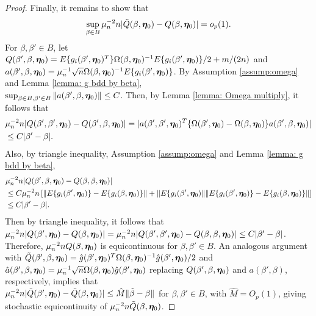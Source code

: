 \documentclass[12pt]{article}
\begin{document}
{\begin{proof}
Finally, it remains to show that 
\[
\sup_{\beta\in B} \mu_n^{-2} n |\tilde Q (\beta, \bm \eta_0)- {Q} (\beta, \bm \eta_0) | =o_p(1).
\]
For $\beta, \beta'\in B$, let  $Q(\beta', \beta, \bm \eta_0)= E\{g_i(\beta', \bm \eta_0)^T\} \Omega(\beta, \bm \eta_0)^{-1} E\{g_i(\beta', \bm \eta_0)\}/2+ m/(2n) $ and  $a(\beta', \beta, \bm \eta_0)= \mu_n^{-1} \sqrt{n} \Omega(\beta, \bm \eta_0)^{-1} E\{g_i(\beta', \bm \eta_0)\} $. By Assumption \ref{assump:omega} and Lemma \ref{lemma: g bdd by beta}, \\ $\sup_{\beta\in B, \beta'\in B }\|a(\beta', \beta, \bm \eta_0) \|\leq C $. Then, by Lemma \ref{lemma: Omega multiply},  it follows that 
\begin{align*}
   & \mu_n^{-2}n |Q(\beta', \beta', \bm \eta_0) -  Q(\beta', \beta, \bm \eta_0)  |= |a(\beta', \beta', \bm \eta_0)^T\{\Omega(\beta', \bm \eta_0) - \Omega(\beta, \bm \eta_0)\}  a(\beta', \beta, \bm \eta_0) | \\
    & \leq C |\beta'-\beta|.
\end{align*}
Also, by triangle inequality, Assumption \ref{assump:omega} and Lemma \ref{lemma: g bdd by beta}, 
\begin{align*}
    &\mu_n^{-2} n |Q(\beta', \beta, \bm \eta_0) -  Q(\beta, \beta, \bm \eta_0)  | \\
    &\leq C\mu_n^{-2} n \left[\|E\{g_i(\beta',\bm \eta_0) \} -E\{g_i(\beta,\bm \eta_0) \} \| + \|E\{g_i(\beta',\bm \eta_0)\| \|E\{g_i(\beta',\bm \eta_0) \} -E\{g_i(\beta,\bm \eta_0) \} \| \right] \\
    &\leq C|\beta'-\beta|.
\end{align*}
Then by triangle inequality, it follows that $\mu_n^{-2}n |Q(\beta', \bm \eta_0)- Q(\beta, \bm \eta_0)|= \mu_n^{-2}n |Q(\beta', \beta',\bm \eta_0)- Q(\beta, \beta, \bm \eta_0)|\leq C|\beta'-\beta|$. Therefore, $\mu_n^{-2}n Q(\beta,\bm \eta_0) $ is equicontinuous for $\beta,\beta'\in B$. An analogous argument with $\tilde Q(\beta', \beta, \bm \eta_0)= \hat g(\beta', \bm \eta_0)^T \Omega(\beta, \bm \eta_0)^{-1} \hat g(\beta', \bm \eta_0)/2 $ and $\hat a(\beta',\beta, \bm \eta_0) =\mu_n^{-1}\sqrt{n}\Omega(\beta, \bm \eta_0) \hat g(\beta', \bm \eta_0) $ replacing $Q(\beta', \beta, \bm \eta_0)$ and $a(\beta',\beta)$, respectively, implies that \\ $\mu_n^{-2} n |\tilde Q(\beta', \bm \eta_0)- \tilde Q(\beta, \bm \eta_0) | \leq \hat M \|\tilde \beta - \beta\|$ for $\beta,\beta'\in B$, with $\hat M= O_p(1)$, giving stochastic equicontinuity of $\mu_n^{-2} n \tilde Q(\beta, \bm \eta_0)$.


\end{proof}}
\end{document}
